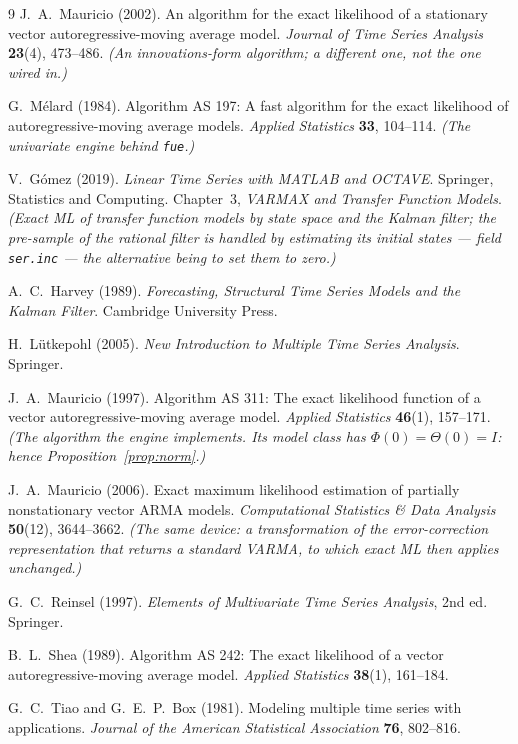 \documentclass[11pt,a4paper]{article}
\theoremstyle{plain}
\theoremstyle{remark}
\begin{document}
\begin{thebibliography}{9}
J.~A.~Mauricio (2002).
An algorithm for the exact likelihood of a stationary vector
autoregressive-moving average model.
\emph{Journal of Time Series Analysis} \textbf{23}(4), 473--486.
\emph{(An innovations-form algorithm; a different one, not the one wired in.)}

G.~M\'elard (1984).
Algorithm AS 197: A fast algorithm for the exact likelihood of
autoregressive-moving average models.
\emph{Applied Statistics} \textbf{33}, 104--114.
\emph{(The univariate engine behind \texttt{fue}.)}

V.~G\'omez (2019).
\emph{Linear Time Series with MATLAB and OCTAVE}. Springer, Statistics and
Computing. Chapter~3, \emph{VARMAX and Transfer Function Models}.
\emph{(Exact ML of transfer function models by state space and the Kalman filter;
the pre-sample of the rational filter is handled by estimating its initial states
--- field \texttt{ser.inc} --- the alternative being to set them to zero.)}

A.~C.~Harvey (1989).
\emph{Forecasting, Structural Time Series Models and the Kalman Filter}.
Cambridge University Press.

H.~L\"utkepohl (2005).
\emph{New Introduction to Multiple Time Series Analysis}. Springer.

J.~A.~Mauricio (1997).
Algorithm AS 311: The exact likelihood function of a vector autoregressive-moving
average model.
\emph{Applied Statistics} \textbf{46}(1), 157--171.
\emph{(The algorithm the engine implements. Its model class has
$\Phi(0)=\Theta(0)=I$: hence Proposition~\ref{prop:norm}.)}

J.~A.~Mauricio (2006).
Exact maximum likelihood estimation of partially nonstationary vector ARMA models.
\emph{Computational Statistics \& Data Analysis} \textbf{50}(12), 3644--3662.
\emph{(The same device: a transformation of the error-correction representation that
returns a standard VARMA, to which exact ML then applies unchanged.)}

G.~C.~Reinsel (1997).
\emph{Elements of Multivariate Time Series Analysis}, 2nd ed. Springer.

B.~L.~Shea (1989).
Algorithm AS 242: The exact likelihood of a vector autoregressive-moving average
model.
\emph{Applied Statistics} \textbf{38}(1), 161--184.

G.~C.~Tiao and G.~E.~P.~Box (1981).
Modeling multiple time series with applications.
\emph{Journal of the American Statistical Association} \textbf{76}, 802--816.


\end{thebibliography}
\end{document}
